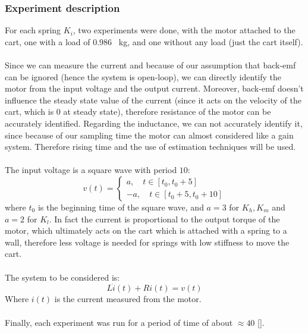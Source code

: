 \subsubsection{Experiment description}
For each spring $K_i$, two experiments were done, with the motor attached to the cart,  one with a load of $0.986$ \SI{}{\kilo\gram}, and one without any load (just the cart itself). \\ \\
Since we can measure the current and because of our assumption that back-emf can be ignored (hence the system is open-loop), we can directly identify the motor from the input voltage and the output current. Moreover, back-emf doesn't influence the steady state value of the current (since it acts on the velocity of the cart, which is $0$ at steady state), therefore resistance of the motor can be accurately identified. Regarding the inductance, we can not accurately identify it, since because of our sampling time the motor can almost considered like a gain system. Therefore rising time and the use of estimation techniques will be used. \\ \\ 
The input voltage  is a square wave with period $10$:
$$v(t) = \begin{cases}
a, \quad t \in [t_0, t_0+5] \\
-a, \quad t \in [t_0+5,t_0+10]
\end{cases}
$$
where $t_0$ is the beginning time of the square wave, and $a=3$ for $K_h, K_m$ and $a=2$ for $K_l$. In fact the current is proportional to the output torque of the motor, which ultimately acts on the cart which is attached with a spring to a wall, therefore less voltage is needed for springs with low stiffness to move the cart. \\ \\ The system to be considered is:
$$L\dot{i}(t)+Ri(t) = v(t)$$
Where $i(t)$ is the current measured from the motor. \\ \\
Finally, each experiment was run for a period of time of about $\approx 40$ [\SI{}{\sec}].

